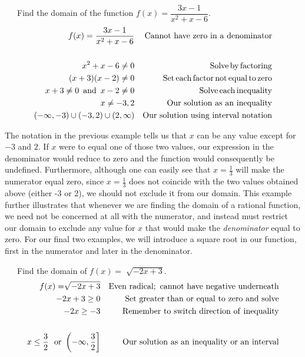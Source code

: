 \begin{example}~~~Find the domain of the function $f (x) = \dfrac{3 x - 1}{x^2 + x - 6}$.
  \begin{eqnarray*}
    f (x) = \frac{3 x - 1}{x^2 + x - 6}
    &  & \operatorname{Cannot~have~zero~in~a~denominator}\\
		& & \\
    x^2 + x - 6 \neq 0 &  & \operatorname{Solve} \operatorname{by} \operatorname{factoring}\\
    (x + 3) (x - 2) \neq 0 &  & \operatorname{Set} \operatorname{each} \operatorname{factor}
    \operatorname{not} \operatorname{equal} \operatorname{to} \operatorname{zero}\\
    x + 3 \neq 0 \operatorname{~and~} x - 2 \neq 0 &  & \operatorname{Solve} \operatorname{each}
    \operatorname{inequality}\\
    x \neq - 3, 2 &  & \operatorname{Our~solution~as~an~inequality}\\
		(-\infty,-3)\cup(-3,2)\cup(2,\infty) & & \text{Our~solution~using~interval~notation}
  \end{eqnarray*}
\end{example}

The notation in the previous example tells us that $x$ can be any value except
for $- 3$ and $2$. If $x$ were to equal one of those two values, our expression in the denominator would reduce to zero and the function
would consequently be undefined.  Furthermore, although one can easily see that $x=\frac{1}{3}$ will make the numerator equal zero, since $x=\frac{1}{3}$ does not coincide with the two values obtained above (either -3 or 2), we should not exclude it from our domain.\pp
This example further illustrates that whenever we are finding the domain of a rational function, we need not be concerned at all with the numerator, and instead must restrict our domain to exclude any value for $x$ that would make the \textit{denominator} equal to zero.\pp
For our final two examples, we will introduce a square root in our function, first in the numerator and later in the denominator.

\begin{example}~~~Find the domain of $f (x) = \sqrt[]{-2 x + 3}$.
  \begin{eqnarray*}
    f (x) = \sqrt[]{-2 x + 3} &  & \operatorname{Even~radical;~cannot~have~negative~underneath}\\
		-2 x + 3 \geq 0 &  & \operatorname{Set~greater~than~or~equal~to~zero~and~solve}\\
    -2 x \geq -3 &  & \operatorname{Remember~to~switch~direction~of~inequality}\\
		& &\\
    x \leq \frac{3}{2} \text{~~or~} \left(-\infty,\frac{3}{2}\right]&  & \operatorname{Our~solution~as~an~inequality~or~an~interval}
  \end{eqnarray*}
\end{example}

